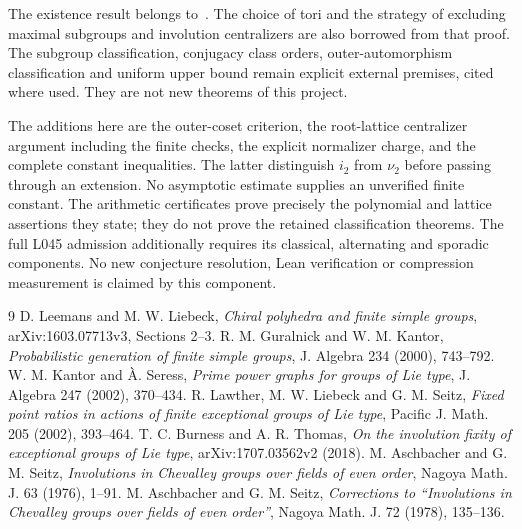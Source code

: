 \documentclass[10pt,a4paper]{article}
\begin{document}
The existence result belongs to~\cite{LL}. The choice of tori and the
strategy of excluding maximal subgroups and involution centralizers are
also borrowed from that proof. The subgroup classification, conjugacy
class orders, outer-automorphism classification and uniform upper bound
remain explicit external premises, cited where used. They are not new
theorems of this project.

The additions here are the outer-coset criterion, the root-lattice
centralizer argument including the finite checks, the explicit normalizer
charge, and the complete constant inequalities. The latter distinguish
$i_2$ from $\nu_2$ before passing through an extension. No asymptotic
estimate supplies an unverified finite constant. The arithmetic certificates
prove precisely the polynomial and lattice assertions they state;
they do not prove the retained classification theorems.
The full L045 admission additionally requires its classical, alternating
and sporadic components. No new conjecture resolution, Lean verification
or compression measurement is claimed by this component.

\begin{thebibliography}{9}\small
{} D. Leemans and M. W. Liebeck, \emph{Chiral polyhedra and
finite simple groups}, arXiv:1603.07713v3, Sections 2--3.
 R. M. Guralnick and W. M. Kantor, \emph{Probabilistic
generation of finite simple groups}, J. Algebra 234 (2000), 743--792.
 W. M. Kantor and \`A. Seress, \emph{Prime power graphs
for groups of Lie type}, J. Algebra 247 (2002), 370--434.
 R. Lawther, M. W. Liebeck and G. M. Seitz,
\emph{Fixed point ratios in actions of finite exceptional groups of
Lie type}, Pacific J. Math. 205 (2002), 393--464.
 T. C. Burness and A. R. Thomas, \emph{On the involution
fixity of exceptional groups of Lie type}, arXiv:1707.03562v2 (2018).
 M. Aschbacher and G. M. Seitz, \emph{Involutions in
Chevalley groups over fields of even order}, Nagoya Math. J. 63
(1976), 1--91.
 M. Aschbacher and G. M. Seitz, \emph{Corrections to
``Involutions in Chevalley groups over fields of even order''},
Nagoya Math. J. 72 (1978), 135--136.
\end{thebibliography}
\end{document}
